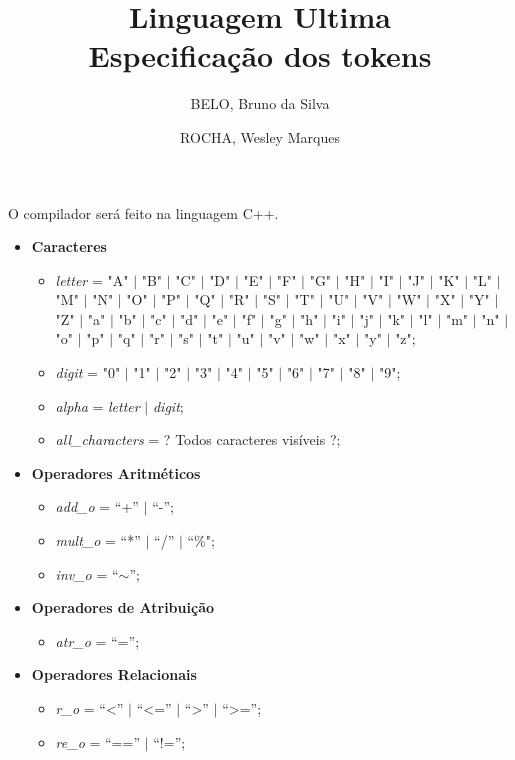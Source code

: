 \documentclass[12pt, a4paper]{IEEEtran}
\author{BELO, Bruno da Silva \and ROCHA, Wesley Marques}
\title{Linguagem Ultima
  \\ Especificação dos tokens}
\begin{document}
\maketitle

O compilador será feito na linguagem C++.
\begin{itemize}
\item \textbf{Caracteres}
  \begin{itemize}
  \item   \emph{letter} = "A" $|$ "B" $|$ "C" $|$ "D" $|$ "E" $|$ "F" $|$ "G"
    $|$ "H" $|$ "I" $|$ "J" $|$ "K" $|$ "L" $|$ "M" $|$ "N"
    $|$ "O" $|$ "P" $|$ "Q" $|$ "R" $|$ "S" $|$ "T" $|$ "U"
    $|$ "V" $|$ "W" $|$ "X" $|$ "Y" $|$ "Z" $|$ "a" $|$ "b"
    $|$ "c" $|$ "d" $|$ "e" $|$ "f" $|$ "g" $|$ "h" $|$ "i"
    $|$ "j" $|$ "k" $|$ "l" $|$ "m" $|$ "n" $|$ "o" $|$ "p"
    $|$ "q" $|$ "r" $|$ "s" $|$ "t" $|$ "u" $|$ "v" $|$ "w"
    $|$ "x" $|$ "y" $|$ "z";

  \item \emph{digit} = "0" $|$ "1" $|$ "2" $|$ "3" $|$ "4" $|$ "5" $|$ "6"
    $|$ "7" $|$ "8" $|$ "9";

  \item \emph{alpha} = \emph{letter} $|$ \emph{digit};
  \item \emph{all\_characters} = ? Todos caracteres visíveis ?;
  \end{itemize}
\end{itemize}

\begin{itemize}
\item \textbf{Operadores Aritméticos}
  \begin{itemize}
  \item \emph{add\_o} = ``+'' $|$ ``-'';
  \item \emph{mult\_o} = ``*'' $|$ ``/'' $|$ ``\%";
  \item \emph{inv\_o} = ``$\sim$'';
  \end{itemize}
\end{itemize}

\begin{itemize}
\item \textbf{Operadores de Atribuição}
  \begin{itemize}
  \item \emph{atr\_o} = ``='';
  \end{itemize}
\end{itemize}

\begin{itemize}
\item \textbf{Operadores Relacionais}
  \begin{itemize}
  \item \emph{r\_o} = ``\textless'' $|$ ``\textless='' $|$ ``\textgreater''
    $|$ ``\textgreater='';
  \item \emph{re\_o} = ``=='' $|$ ``!='';
  \end{itemize}
\end{itemize}
\end{document}
